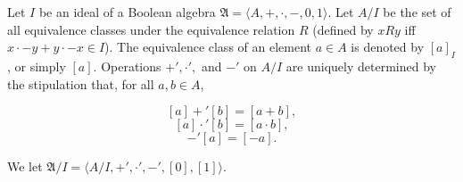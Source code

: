 Let $I$ be an ideal of a Boolean algebra $\mathfrak{A} = \langle A, +, \cdot, -, 0, 1 \rangle$. Let $A/I$ be the set of all equivalence classes under the equivalence relation $R$ (defined by $xRy$ iff $x \cdot -y + y \cdot -x \in I$). The equivalence class of an element $a \in A$ is denoted by $[a]_I$, or simply $[a]$. Operations $+', \cdot',$ and $-'$ on $A/I$ are uniquely determined by the stipulation that, for all $a, b \in A$,

$$[a] +' [b] = [a + b],$$
$$[a] \cdot' [b] = [a \cdot b],$$
$$-' [a] = [-a].$$

We let $\mathfrak{A}/I = \langle A/I, +', \cdot', -', [0], [1] \rangle$.
